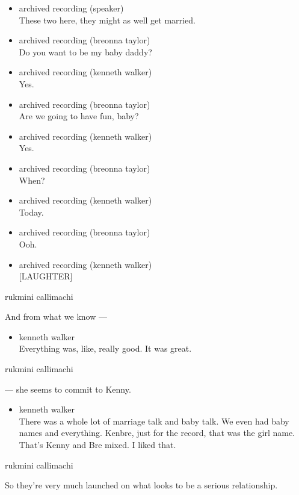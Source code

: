 \begin{itemize}
\item
  archived recording (speaker)\\
  These two here, they might as well get married.
\item
  archived recording (breonna taylor)\\
  Do you want to be my baby daddy?
\item
  archived recording (kenneth walker)\\
  Yes.
\item
  archived recording (breonna taylor)\\
  Are we going to have fun, baby?
\item
  archived recording (kenneth walker)\\
  Yes.
\item
  archived recording (breonna taylor)\\
  When?
\item
  archived recording (kenneth walker)\\
  Today.
\item
  archived recording (breonna taylor)\\
  Ooh.
\item
  archived recording (kenneth walker)\\
  {[}LAUGHTER{]}
\end{itemize}

rukmini callimachi

And from what we know ---

\begin{itemize}
\tightlist
\item
  kenneth walker\\
  Everything was, like, really good. It was great.
\end{itemize}

rukmini callimachi

--- she seems to commit to Kenny.

\begin{itemize}
\tightlist
\item
  kenneth walker\\
  There was a whole lot of marriage talk and baby talk. We even had baby
  names and everything. Kenbre, just for the record, that was the girl
  name. That's Kenny and Bre mixed. I liked that.
\end{itemize}

rukmini callimachi

So they're very much launched on what looks to be a serious
relationship.

